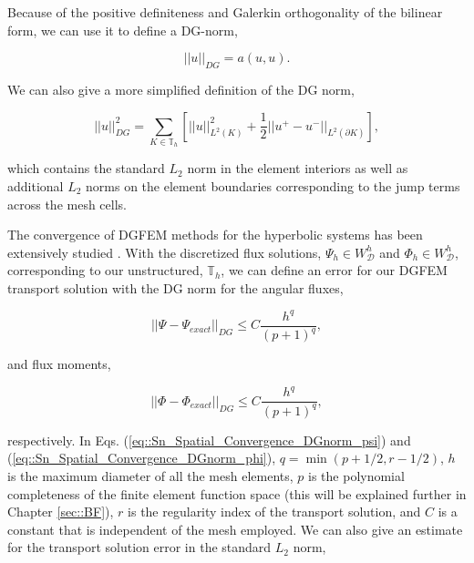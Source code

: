 \noindent Because of the positive definiteness and Galerkin orthogonality of the bilinear form, we can use it to define a DG-norm,

\begin{equation}
\label{eq::Sn_Spatial_Convergence_DGnorm_bilinear}
|| u  ||_{DG} = a(u,u).
\end{equation}

\noindent We can also give a more simplified definition of the DG norm,

\begin{equation}
\label{eq::Sn_Spatial_Convergence_DGform}
|| u ||^2_{DG} = \sum_{K \in \mathbb{T}_h} \left[  || u  ||^2_{L^2 (K)} + \frac{1}{2} || u^+ - u^- ||_{L^2 (\partial K)} \right],
\end{equation}

\noindent which contains the standard $L_2$ norm in the element interiors as well as additional $L_2$ norms on the element boundaries corresponding to the jump terms across the mesh cells.

The convergence of DGFEM methods for the hyperbolic systems has been extensively studied \cite{lesaint1974finite,houston2000stabilized,houston2002discontinuous,wang2009convergence}. With the discretized flux solutions, $\Psi_h \in W^h_{\mathcal{D}}$ and $\Phi_h \in W^h_{\mathcal{D}}$, corresponding to our unstructured, $\mathbb{T}_h$, we can define an error for our DGFEM transport solution with the DG norm for the angular fluxes,


\begin{equation}
\label{eq::Sn_Spatial_Convergence_DGnorm_psi}
|| \Psi - \Psi_{exact} ||_{DG} \leq C \frac{h^q}{(p+1)^q},
\end{equation}

\noindent and flux moments,

\begin{equation}
\label{eq::Sn_Spatial_Convergence_DGnorm_phi}
|| \Phi - \Phi_{exact} ||_{DG} \leq C \frac{h^q}{(p+1)^q},
\end{equation}

\noindent respectively. In Eqs. (\ref{eq::Sn_Spatial_Convergence_DGnorm_psi}) and (\ref{eq::Sn_Spatial_Convergence_DGnorm_phi}), $q = \min (p+1/2, r - 1/2)$, $h$ is the maximum diameter of all the mesh elements, $p$ is the polynomial completeness of the finite element function space (this will be explained further in Chapter \ref{sec::BF}), $r$ is the regularity index of the transport solution, and $C$ is a constant that is independent of the mesh employed. We can also give an estimate for the transport solution error in the standard $L_2$ norm,

